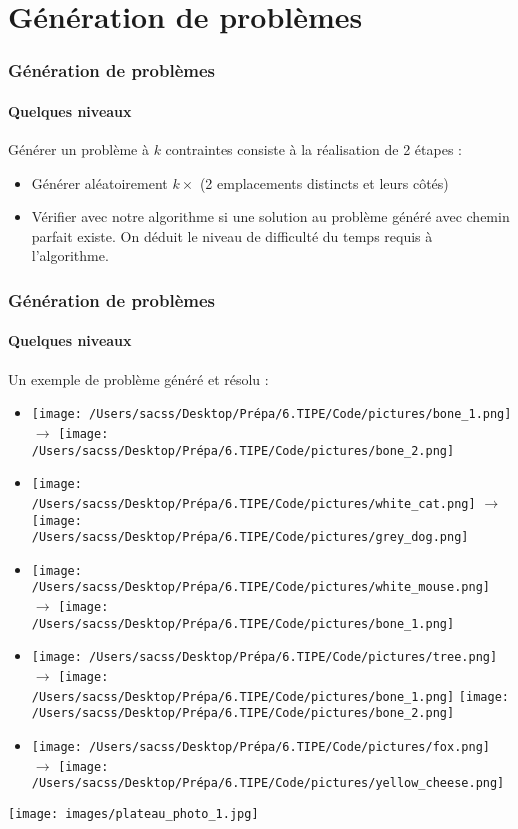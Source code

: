 \documentclass{beamer}
\begin{document}
\section{Génération de problèmes}

\begin{frame}
	\frametitle{Génération de problèmes}
	\framesubtitle{Quelques niveaux}
	Générer un problème à $k$ contraintes consiste à la réalisation de 2 étapes : 
	\begin{itemize}
		\item Générer aléatoirement $k \times $ (2 emplacements distincts et leurs côtés)
		\item Vérifier avec notre algorithme si une solution au problème généré avec chemin parfait existe. On déduit le niveau de difficulté du temps requis à l'algorithme.
	\end{itemize}
	
\end{frame}
\begin{frame}
	\frametitle{Génération de problèmes}
	\framesubtitle{Quelques niveaux}
	Un exemple de problème généré et résolu : 
	\begin{multicols}{2}
		\begin{itemize}
			\item \texttt{[image: /Users/sacss/Desktop/Prépa/6.TIPE/Code/pictures/bone\_1.png]} $\rightarrow$ \texttt{[image: /Users/sacss/Desktop/Prépa/6.TIPE/Code/pictures/bone\_2.png]}
			\item \texttt{[image: /Users/sacss/Desktop/Prépa/6.TIPE/Code/pictures/white\_cat.png]} $\rightarrow$ \texttt{[image: /Users/sacss/Desktop/Prépa/6.TIPE/Code/pictures/grey\_dog.png]}
			\item \texttt{[image: /Users/sacss/Desktop/Prépa/6.TIPE/Code/pictures/white\_mouse.png]} $\rightarrow$ \texttt{[image: /Users/sacss/Desktop/Prépa/6.TIPE/Code/pictures/bone\_1.png]}
			\item \texttt{[image: /Users/sacss/Desktop/Prépa/6.TIPE/Code/pictures/tree.png]} $\rightarrow$ \texttt{[image: /Users/sacss/Desktop/Prépa/6.TIPE/Code/pictures/bone\_1.png]} \texttt{[image: /Users/sacss/Desktop/Prépa/6.TIPE/Code/pictures/bone\_2.png]}
			\item \texttt{[image: /Users/sacss/Desktop/Prépa/6.TIPE/Code/pictures/fox.png]} $\rightarrow$ \texttt{[image: /Users/sacss/Desktop/Prépa/6.TIPE/Code/pictures/yellow\_cheese.png]}
		\end{itemize}

		\begin{center}
			\texttt{[image: images/plateau\_photo\_1.jpg]}
		\end{center}
	\end{multicols}
	
\end{frame}
\end{document}
